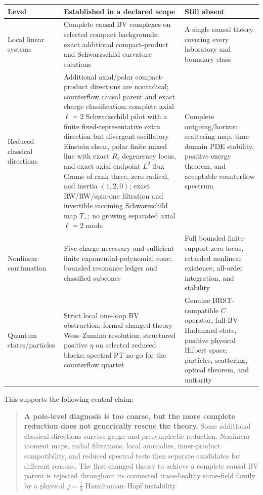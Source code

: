 \documentclass[11pt]{article}
\begin{document}
\begin{center}
\begin{tabularx}{\textwidth}{@{}p{}YY@{}}
\toprule
Level & Established in a declared scope & Still absent \\
\midrule
Local linear systems & Complete causal BV complexes on selected compact
backgrounds; exact additional compact-product and Schwarzschild curvature
solutions & A single causal theory covering every laboratory and boundary
class \\
Reduced classical directions & Additional axial/polar compact-product
directions are nonradical; counterflow causal parent and exact charge
classification; complete axial $\ell=2$ Schwarzschild pilot with a finite
fixed-representative extra direction but divergent oscillatory Einstein
shear, polar finite mixed line with exact $R_\ell$ degeneracy locus, and
exact axial endpoint $L^2$ flux Grams of rank three, zero radical, and
inertia $(1,2,0)$; exact RW/RW/spin-one filtration and invertible incoming
Schwarzschild map \(T_-\); no growing separated axial \(\ell=2\) mode &
Complete outgoing/horizon scattering map, time-domain PDE stability,
positive energy theorem, and acceptable counterflow spectrum \\
Nonlinear continuation & Five-charge necessary-and-sufficient finite
exponential-polynomial cone; bounded resonance ledger and classified
subcones & Full bounded finite-support zero locus, retarded nonlinear
existence, all-order integration, and stability \\
Quantum states/particles & Strict local one-loop BV obstruction; formal
changed-theory Wess--Zumino resolution; structured positive $\eta$ on
selected reduced blocks; spectral PT no-go for the counterflow quartet &
Genuine BRST-compatible $C$ operator, full-BV Hadamard state, positive
physical Hilbert space, particles, scattering, optical theorem, and unitarity \\
\bottomrule
\end{tabularx}
\end{center}

This supports the following central claim:
\begin{quote}
\textbf{A pole-level diagnosis is too coarse, but the more complete reduction
does not generically rescue the theory.}  Some additional classical
directions survive gauge and presymplectic reduction.  Nonlinear moment maps,
radial filtrations, local anomalies, inner-product compatibility, and reduced
spectral tests then separate candidates for different reasons.  The first changed
theory to achieve a complete causal BV parent is rejected throughout its
connected trace-healthy same-field family by a physical
$j=\tfrac12$ Hamiltonian--Hopf instability.
\end{quote}
\end{document}
